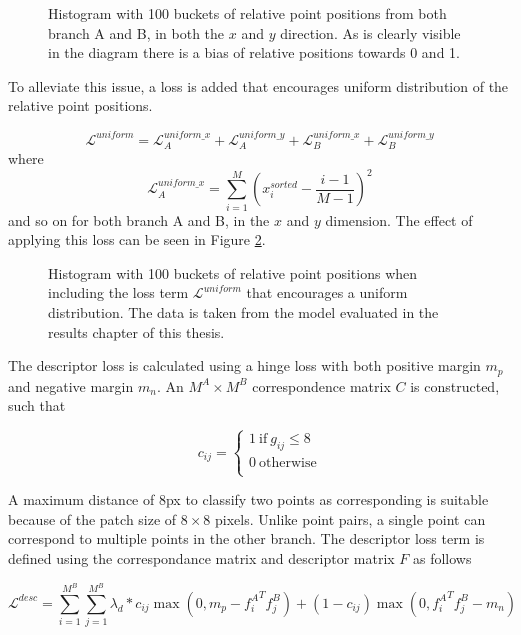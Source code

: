 \begin{figure}[H]
	\begin{center}
		
	\end{center}
	\caption{Histogram with 100 buckets of relative point positions from both branch A and B, in both the $x$ and $y$ direction. As is clearly visible in the diagram there is a bias of relative positions towards 0 and 1.}
	\label{fig:hist-no-unixy}
\end{figure}

To alleviate this issue, a loss is added that encourages uniform distribution of the relative point positions.


\[
\mathcal{L}^{uniform}=\mathcal{L}^{uniform\_x}_A+\mathcal{L}^{uniform\_y}_A+\mathcal{L}^{uniform\_x}_B+\mathcal{L}^{uniform\_y}_B
\]
where
\[
\mathcal{L}^{uniform\_x}_A=\sum_{i=1}^M\left(x_i^{sorted}-\frac{i-1}{M-1}\right)^2
\]
and so on for both branch A and B, in the $x$ and $y$ dimension. The effect of applying this loss can be seen in Figure \ref{fig:hist-unixy}.

\begin{figure}[H]
	\begin{center}
		
	\end{center}
	\caption{Histogram with 100 buckets of relative point positions when including the loss term $\mathcal{L}^{uniform}$ that encourages a uniform distribution. The data is taken from the model evaluated in the results chapter of this thesis.}
	\label{fig:hist-unixy}
\end{figure}

The descriptor loss is calculated using a hinge loss with both positive margin $m_p$ and negative margin $m_n$. An $M^A\times M^B$ correspondence matrix $C$ is constructed, such that

\[
c_{ij}=
\begin{cases}
1\ \text{if}\ g_{ij}\le 8 \\
0\ \text{otherwise} \\
\end{cases}
\]

A maximum distance of 8px to classify two points as corresponding is suitable because of the patch size of $8\times 8$ pixels. Unlike point pairs, a single point can correspond to multiple points in the other branch. The descriptor loss term is defined using the correspondance matrix and descriptor matrix $F$ as follows

\[
\mathcal{L}^{desc}=\sum^{M^B}_{i=1}\sum^{M^B}_{j=1}\lambda_d*c_{ij}\max\left(0,m_p-{f_i^A}^Tf_j^B\right)+(1-c_{ij})\max\left(0,{f_i^A}^Tf_j^B-m_n\right)
\]

